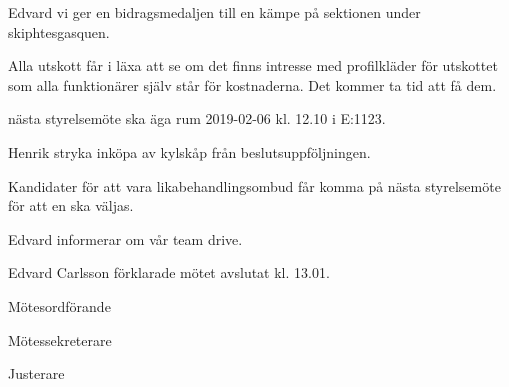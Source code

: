 \documentclass[10pt]{article}
\def\mo{Edvard Carlsson}
\def\ms{Sonja Kenari}
\def\ji{Lina Samnegård}
\begin{document}
\begin{paragrafer}
Edvard \ypa vi ger en bidragsmedaljen till en kämpe på sektionen under skiphtesgasquen.

\Mbaby

Alla utskott får i läxa att se om det finns intresse med profilkläder för utskottet som alla funktionärer själv står för kostnaderna. 
Det kommer ta tid att få dem.

\Mba nästa styrelsemöte ska äga rum 2019-02-06 kl. 12.10 i E:1123.

Henrik \ypa stryka inköpa av kylskåp från beslutsuppföljningen.

\Mbaby

Kandidater för att vara likabehandlingsombud får komma på nästa styrelsemöte för att en ska väljas.

Edvard informerar om vår team drive.


{\mo} förklarade mötet avslutat kl. 13.01. 
\end{paragrafer}

\hidesignfoot
\begin{signatures}{3}
\signature{\mo}{Mötesordförande}
\signature{\ms}{Mötessekreterare}
\signature{\ji}{Justerare}
\end{signatures}
\end{document}
